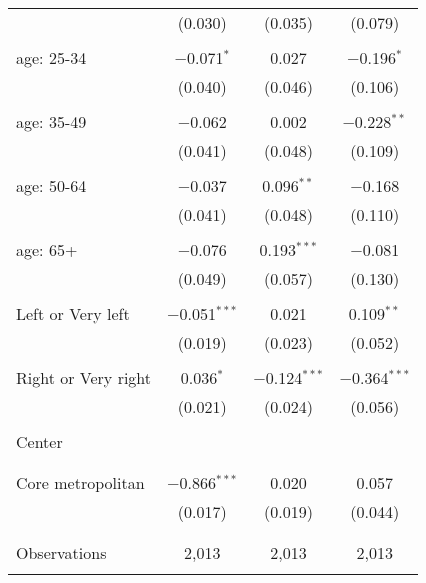 \begin{tabular}{@{\extracolsep{5pt}}lccc}
  & (0.030) & (0.035) & (0.079) \\ 
  & & & \\ 
 age: 25-34 & $-$0.071$^{*}$ & 0.027 & $-$0.196$^{*}$ \\ 
  & (0.040) & (0.046) & (0.106) \\ 
  & & & \\ 
 age: 35-49 & $-$0.062 & 0.002 & $-$0.228$^{**}$ \\ 
  & (0.041) & (0.048) & (0.109) \\ 
  & & & \\ 
 age: 50-64 & $-$0.037 & 0.096$^{**}$ & $-$0.168 \\ 
  & (0.041) & (0.048) & (0.110) \\ 
  & & & \\ 
 age: 65+ & $-$0.076 & 0.193$^{***}$ & $-$0.081 \\ 
  & (0.049) & (0.057) & (0.130) \\ 
  & & & \\ 
 Left or Very left & $-$0.051$^{***}$ & 0.021 & 0.109$^{**}$ \\ 
  & (0.019) & (0.023) & (0.052) \\ 
  & & & \\ 
 Right or Very right & 0.036$^{*}$ & $-$0.124$^{***}$ & $-$0.364$^{***}$ \\ 
  & (0.021) & (0.024) & (0.056) \\ 
  & & & \\ 
 Center &  &  &  \\ 
  &  &  &  \\ 
  & & & \\ 
 Core metropolitan & $-$0.866$^{***}$ & 0.020 & 0.057 \\ 
  & (0.017) & (0.019) & (0.044) \\ 
  & & & \\ 
\hline \\[-1.8ex] 

Observations & 2,013 & 2,013 & 2,013 \\ 
\hline 
\hline \\[-1.8ex] 
\end{tabular} 